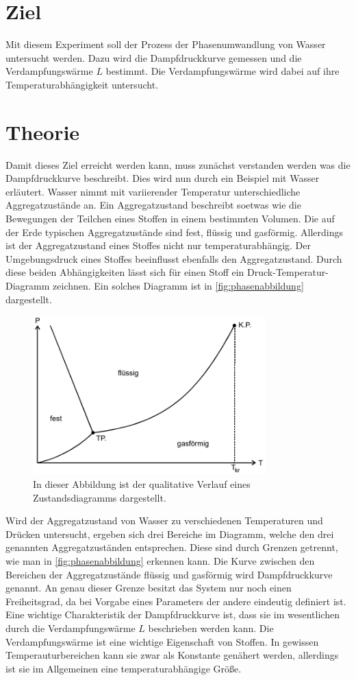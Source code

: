 \section{Ziel}
\label{sec:Ziel}
Mit diesem Experiment soll der Prozess der Phasenumwandlung von Wasser untersucht werden. Dazu wird die Dampfdruckkurve gemessen und die Verdampfungswärme $L$ bestimmt. Die Verdampfungswärme wird
dabei auf ihre Temperaturabhängigkeit untersucht.
\section{Theorie}
\label{sec:Theorie}
Damit dieses Ziel erreicht werden kann, muss zunächst verstanden werden was die Dampfdruckkurve beschreibt. Dies wird nun durch ein Beispiel mit Wasser erläutert.
Wasser nimmt mit variierender Temperatur unterschiedliche Aggregatzustände an. Ein Aggregatzustand beschreibt soetwas wie die Bewegungen der Teilchen eines Stoffen in einem bestimmten Volumen.
Die auf der Erde typischen Aggregatzustände sind fest, flüssig und gasförmig. Allerdings ist der Aggregatzustand eines Stoffes nicht nur temperaturabhängig. Der Umgebungsdruck eines Stoffes 
beeinflusst ebenfalls den Aggregatzustand. Durch diese beiden Abhängigkeiten lässt sich für einen Stoff ein Druck-Temperatur-Diagramm zeichnen. Ein solches Diagramm ist in \autoref{fig:phasenabbildung}
dargestellt.
\begin{figure}
    \centering
    \includegraphics[width=0.8\textwidth]{content/Phasenabbildung.PNG}
	\caption{In dieser Abbildung ist der qualitative Verlauf eines Zustandsdiagramms dargestellt. \cite{v203}}
	\label{fig:phasenabbildung}
\end{figure}
Wird der Aggregatzustand von Wasser zu verschiedenen Temperaturen und Drücken untersucht, ergeben sich drei Bereiche im Diagramm, welche den drei genannten Aggregatzuständen entsprechen.  
Diese sind durch Grenzen
getrennt, wie man in \autoref{fig:phasenabbildung} erkennen kann. Die Kurve zwischen den Bereichen der Aggregatzustände flüssig und gasförmig wird Dampfdruckkurve genannt. An genau dieser Grenze besitzt das System
nur noch einen Freiheitsgrad, da bei Vorgabe eines Parameters der andere eindeutig definiert ist. Eine wichtige Charakteristik der Dampfdruckkurve ist, dass sie im wesentlichen durch die 
Verdampfungswärme $L$ beschrieben werden kann. Die Verdampfungswärme ist eine wichtige Eigenschaft von Stoffen. In gewissen Temperauturbereichen kann sie zwar als Konstante genähert werden,
allerdings ist sie im Allgemeinen eine temperaturabhängige Größe. 

